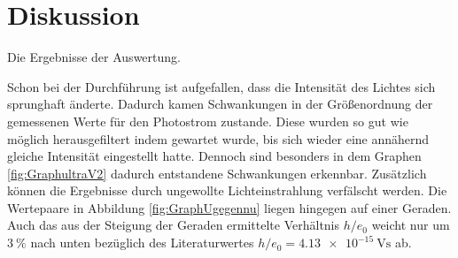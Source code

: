 
\section{Diskussion}
\label{sec:Diskussion}

 \begin{table}
  \centering
  \caption{Die Ergebnisse der Auswertung.}
  
 \end{table}

Schon bei der Durchführung ist aufgefallen, dass die Intensität des Lichtes sich
 sprunghaft änderte. Dadurch kamen Schwankungen in der Größenordnung der gemessenen
  Werte für den Photostrom zustande. Diese wurden so gut wie möglich herausgefiltert
   indem gewartet wurde, bis sich wieder eine annähernd gleiche Intensität eingestellt
   hatte. Dennoch sind besonders in dem Graphen \ref{fig:GraphultraV2} dadurch
   entstandene Schwankungen erkennbar. Zusätzlich können die Ergebnisse durch
   ungewollte Lichteinstrahlung verfälscht werden. Die Wertepaare in Abbildung
   \ref{fig:GraphUgegennu} liegen hingegen auf einer Geraden. Auch das aus
   der Steigung der Geraden ermittelte Verhältnis $h/e_0$ weicht nur um
   $\SI{3}{\percent}$ nach unten bezüglich des Literaturwertes
   $h/e_0=\SI{4.13e-15}{\volt\second}$ \cite{nistgov} ab.
